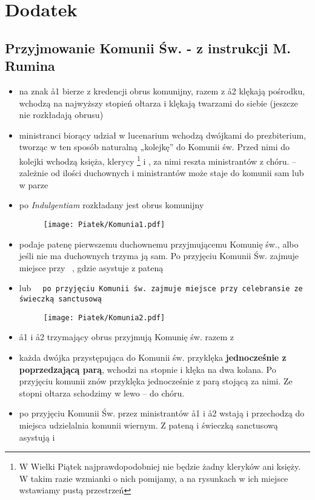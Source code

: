 \section{Dodatek}
\subsection{Przyjmowanie Komunii Św. - z instrukcji M. Rumina}
\label{komunia}

\begin{itemize}
  \item na znak  \aa1 bierze z kredencji obrus komunijny, razem z \aa2
        klękają pośrodku, wchodzą na najwyższy stopień ołtarza i klękają
        twarzami do siebie (jeszcze nie rozkładają obrusu)
  \item ministranci biorący udział w lucenarium wchodzą dwójkami do
        prezbiterium, tworząc w ten sposób naturalną „kolejkę” do Komunii św.
        Przed nimi do kolejki wchodzą księża, klerycy  \footnote{W Wielki Piątek
        najprawdopodobniej nie będzie żadny kleryków ani księży. W takim razie
        wzmianki o nich pomijamy, a na rysunkach w ich miejsce wstawiamy pustą
        przestrzeń} i , za nimi reszta ministrantów z chóru.  – zależnie
        od ilości duchownych i ministrantów może staje do komunii sam lub w
        parze
  \item po \textit{Indulgentiam} rozkładany jest obrus komunijny

        \begin{figure}[h]
          \centering
          \texttt{[image: Piatek/Komunia1.pdf]}
        \end{figure}

  \item {} podaje patenę pierwszemu duchownemu przyjmującemu Komunię św., albo
        jeśli nie ma duchownych trzyma ją sam. Po przyjęciu Komunii Św. zajmuje
        miejsce przy \ii~, gdzie asystuje z pateną
  \item {} lub \tt~ po przyjęciu Komunii św. zajmuje miejsce przy celebransie
        ze świeczką sanctusową

        \begin{figure}[h]
          \centering
          \texttt{[image: Piatek/Komunia2.pdf]}
        \end{figure}

  \item \aa1 i \aa2 trzymający obrus przyjmują Komunię św. razem z 
  \item każda dwójka przystępująca do Komunii św. przyklęka \textbf{jednocześnie
          z poprzedzającą parą}, wchodzi na stopnie i klęka na dwa kolana. Po
          przyjęciu komunii znów przyklęka jednocześnie z parą stojącą za nimi.
          Ze stopni ołtarza schodzimy w lewo – do chóru.
  \item po przyjęciu Komunii Św. przez ministrantów \aa1 i \aa2 wstają i
        przechodzą do miejsca udzielalnia komunii wiernym. Z pateną i świeczką
        sanctusową asystują  i 


\end{itemize}
